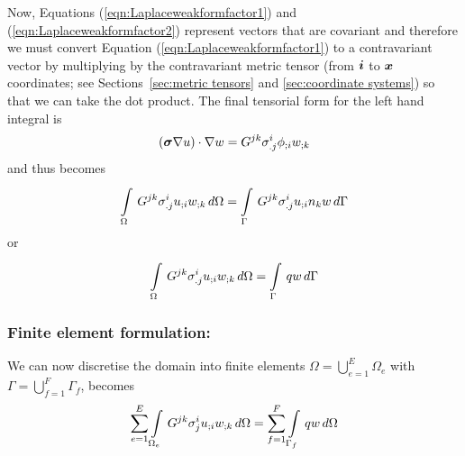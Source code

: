 Now, Equations (\ref{eqn:Laplaceweakformfactor1}) and (\ref{eqn:Laplaceweakformfactor2})
represent vectors that are covariant and therefore we must convert Equation
(\ref{eqn:Laplaceweakformfactor1}) to a contravariant vector by 
multiplying by the contravariant metric tensor (from $\vect{i}$ to $\vect{x}$ 
coordinates; see Sections~\ref{sec:metric tensors} and \ref{sec:coordinate systems})
so that we can take the dot product. The final tensorial form for the left
hand integral is
\begin{equation}
  \dotprod{\pbrac{\tensor{\sigma}\gradient{}{u}}}{\gradient{}{w}} = 
  G^{jk}\sigma^{i}_{.j}\covarderiv{\phi}{i}\covarderiv{w}{k}
\end{equation}
and thus  becomes
\begin{equation}
    \displaystyle\int\limits_{\Omega}^{} \,G^{jk}\sigma^{i}_{.j} {u}_{;i}  {w}_{;k} \,d\Omega 
  =   \displaystyle\int\limits_{\Gamma}^{} \,G^{jk}\sigma^{i}_{.j} {u}_{;i} n_{k}w\,d\Gamma 
  \label{eqn:Laplaceweightedresidualtensorform1}
\end{equation}
or
\begin{equation}
    \displaystyle\int\limits_{\Omega}^{} \,G^{jk}\sigma^{i}_{.j} {u}_{;i}  {w}_{;k} \,d\Omega 
  =   \displaystyle\int\limits_{\Gamma}^{} \,qw\,d\Gamma 
  \label{eqn:Laplaceweightedresidualtensorform2}
\end{equation}

\subsubsection{Finite element formulation:}

We can now discretise the domain into finite elements \ie $\Omega=
\displaystyle{\bigcup_{e=1}^{E}}\Omega_{e}$ with
$\Gamma=\displaystyle{\bigcup_{f=1}^{F}}\Gamma_{f}$, 
 becomes
\begin{equation}
  \displaystyle\sum_{e=1}^{E}  \displaystyle\int\limits_{\Omega_{e}}^{} \,G^{jk}\sigma^{i}_{j} {u}_{;i}  {w}_{;k} \,d\Omega 
  =\displaystyle\sum_{f=1}^{F}  \displaystyle\int\limits_{\Gamma_{f}}^{} \,qw\,d\Omega 
\end{equation}


